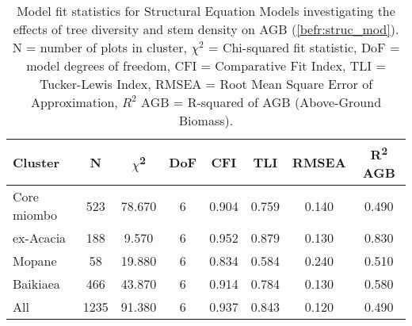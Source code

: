 \begin{table}[tb] 
	\caption[Model fit statistics per vegetation type]{Model fit statistics for Structural Equation Models investigating the effects of tree diversity and stem density on AGB (\autoref{befr:struc_mod}). N = number of plots in cluster, $\chi^{2}$ = Chi-squared fit statistic, DoF = model degrees of freedom, CFI = Comparative Fit Index, TLI = Tucker-Lewis Index, RMSEA = Root Mean Square Error of Approximation, $R^{2}$ AGB = R-squared of AGB (Above-Ground Biomass).} 
	\label{befr:struc_model_fit_clust_stats} 
	\begin{tabular}{lS[table-format=3.2,table-column-width=0.5cm]SS[table-format=3.2,table-column-width=0.5cm]SSSS} 
\toprule
{Cluster} & {N} & {$\chi$\textsuperscript{2}} & {DoF} & {CFI} & {TLI} & {RMSEA} & {R\textsuperscript{2} AGB} \\
\midrule
Core miombo & 523 & 78.670 & 6 & 0.904 & 0.759 & 0.140 & 0.490 \\ 
ex-Acacia & 188 & 9.570 & 6 & 0.952 & 0.879 & 0.130 & 0.830 \\ 
Mopane & 58 & 19.880 & 6 & 0.834 & 0.584 & 0.240 & 0.510 \\ 
Baikiaea & 466 & 43.870 & 6 & 0.914 & 0.784 & 0.130 & 0.580 \\ 
All & 1235 & 91.380 & 6 & 0.937 & 0.843 & 0.120 & 0.490 \\ 
\bottomrule
\end{tabular} 
\end{table} 
